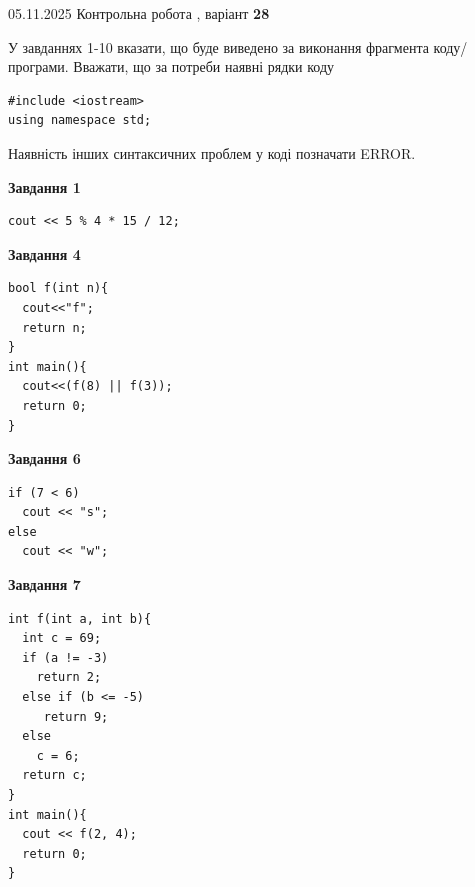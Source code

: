 \documentclass[12pt, ukrainian]{article}
\begin{document}
{\Large{05.11.2025 Контрольна робота , варіант  \No \textbf { 28 }\par}}
{
\begin {large}
У завданнях 1-10 вказати, що буде виведено за виконання фрагмента коду/про\-гра\-ми.
Вважати, що за потреби наявні рядки коду
\begin{verbatim}
#include <iostream>
using namespace std;
\end{verbatim}
Наявність інших синтаксичних проблем у коді позначати ERROR.

\begin{minipage}[t]{7.0cm}

\begin{center}
\textbf{Завдання 1}
\end{center}
\vspace{-8mm}

\begin{verbatim}
cout << 5 % 4 * 15 / 12;
\end{verbatim}



\begin{center}
\textbf{Завдання 4}
\end{center}
\vspace{-8mm}

\begin{verbatim}
bool f(int n){
  cout<<"f";
  return n;
}
int main(){
  cout<<(f(8) || f(3));
  return 0;
}
\end{verbatim}



\begin{center}
\textbf{Завдання 6}
\end{center}
\vspace{-8mm}

\begin{verbatim}
if (7 < 6)
  cout << "s";
else
  cout << "w";
\end{verbatim}



\begin{center}
\textbf{Завдання 7}
\end{center}
\vspace{-8mm}

\begin{verbatim}
int f(int a, int b){
  int c = 69;
  if (a != -3)
    return 2;
  else if (b <= -5)
     return 9;
  else
    c = 6;
  return c;
}
int main(){
  cout << f(2, 4);
  return 0;
}
\end{verbatim}


\end{minipage}
\end{large}}
\end{document}
